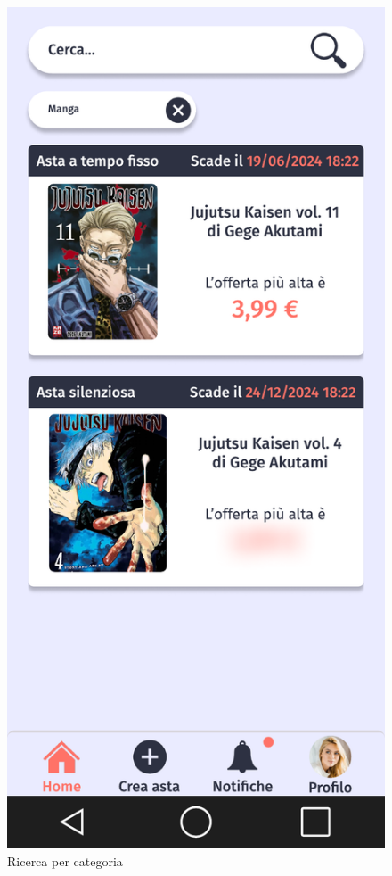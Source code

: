 \begin{figure}[!htb]
\begin{minipage}{0.32\textwidth}
            \includegraphics[width=.7\linewidth]{Immagini/Frames/Compratore/C3.pdf}
            \caption{Ricerca per categoria}
        \end{minipage}\hfill
        \begin{minipage}{0.32\textwidth}
            \centering

\end{minipage}
\end{figure}
